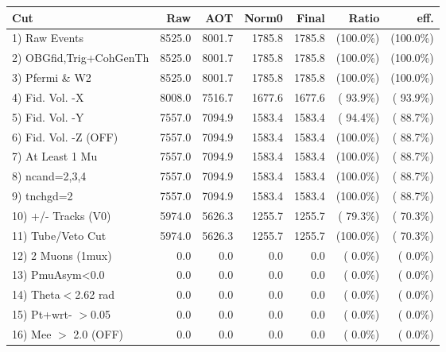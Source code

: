  \begin{table}[h!]\centering
 \begin{tabular}{||l||r|r|r|r|r|r||}
 \hline
 \hline
 Cut & Raw & AOT & Norm0 & Final & Ratio & eff.       \\
 \hline
  1) Raw Events           &       8525.0 &       8001.7 &       1785.8 &       1785.8 & (100.0\%) & (100.0\%) \\
  2) OBGfid,Trig+CohGenTh &       8525.0 &       8001.7 &       1785.8 &       1785.8 & (100.0\%) & (100.0\%) \\
  3) Pfermi \& W2         &       8525.0 &       8001.7 &       1785.8 &       1785.8 & (100.0\%) & (100.0\%) \\
  4) Fid. Vol. -X         &       8008.0 &       7516.7 &       1677.6 &       1677.6 & ( 93.9\%) & ( 93.9\%) \\
  5) Fid. Vol. -Y         &       7557.0 &       7094.9 &       1583.4 &       1583.4 & ( 94.4\%) & ( 88.7\%) \\
  6) Fid. Vol. -Z (OFF)   &       7557.0 &       7094.9 &       1583.4 &       1583.4 & (100.0\%) & ( 88.7\%) \\
  7) At Least 1 Mu        &       7557.0 &       7094.9 &       1583.4 &       1583.4 & (100.0\%) & ( 88.7\%) \\
  8) ncand=2,3,4          &       7557.0 &       7094.9 &       1583.4 &       1583.4 & (100.0\%) & ( 88.7\%) \\
  9) tnchgd=2             &       7557.0 &       7094.9 &       1583.4 &       1583.4 & (100.0\%) & ( 88.7\%) \\
 10) +/- Tracks (V0)      &       5974.0 &       5626.3 &       1255.7 &       1255.7 & ( 79.3\%) & ( 70.3\%) \\
 11) Tube/Veto Cut        &       5974.0 &       5626.3 &       1255.7 &       1255.7 & (100.0\%) & ( 70.3\%) \\
 12) 2 Muons (1mux)       &          0.0 &          0.0 &          0.0 &          0.0 & (  0.0\%) & (  0.0\%) \\
 13) PmuAsym<0.0          &          0.0 &          0.0 &          0.0 &          0.0 & (  0.0\%) & (  0.0\%) \\
 14) Theta$<$2.62 rad     &          0.0 &          0.0 &          0.0 &          0.0 & (  0.0\%) & (  0.0\%) \\
 15) Pt+wrt- $>$0.05      &          0.0 &          0.0 &          0.0 &          0.0 & (  0.0\%) & (  0.0\%) \\
 16) Mee $>$ 2.0  (OFF)   &          0.0 &          0.0 &          0.0 &          0.0 & (  0.0\%) & (  0.0\%) \\

\end{tabular}
\end{table}
